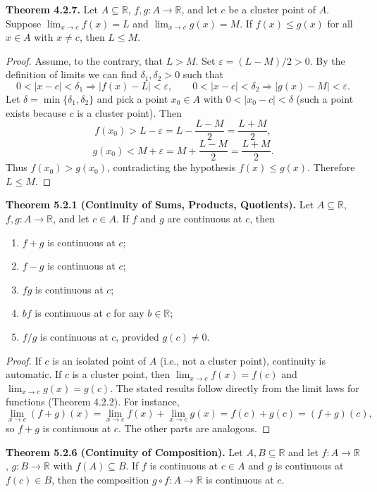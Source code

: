 \documentclass[12pt,a4paper]{article}
\theoremstyle{definition}
\newcommand{\R}{\mathbb{R}}
\newcommand{\eps}{\varepsilon}
\newcommand{\abs}[1]{\left\lvert#1\right\rvert}
\begin{document}
\textbf{Theorem 4.2.7.} Let \(A\subseteq\R\), \(f,g:A\to\R\), and let \(c\) be a cluster point of \(A\). Suppose \(\lim_{x\to c}f(x)=L\) and \(\lim_{x\to c}g(x)=M\). If \(f(x)\le g(x)\) for all \(x\in A\) with \(x\neq c\), then \(L\le M\).

\begin{proof}
Assume, to the contrary, that \(L>M\). Set \(\eps = (L-M)/2>0\). By the definition of limits we can find \(\delta_1,\delta_2>0\) such that
\[
0<\abs{x-c}<\delta_1 \Rightarrow \abs{f(x)-L}<\eps,\qquad
0<\abs{x-c}<\delta_2 \Rightarrow \abs{g(x)-M}<\eps.
\]
Let \(\delta = \min\{\delta_1,\delta_2\}\) and pick a point \(x_0\in A\) with \(0<\abs{x_0-c}<\delta\) (such a point exists because \(c\) is a cluster point). Then
\[
f(x_0) > L-\eps = L - \frac{L-M}{2} = \frac{L+M}{2},
\]
\[
g(x_0) < M+\eps = M + \frac{L-M}{2} = \frac{L+M}{2}.
\]
Thus \(f(x_0) > g(x_0)\), contradicting the hypothesis \(f(x)\le g(x)\). Therefore \(L\le M\).
\end{proof}

\textbf{Theorem 5.2.1 (Continuity of Sums, Products, Quotients).} Let \(A\subseteq\R\), \(f,g:A\to\R\), and let \(c\in A\). If \(f\) and \(g\) are continuous at \(c\), then
\begin{enumerate}[label=(\alph*)]
    \item \(f+g\) is continuous at \(c\);
    \item \(f-g\) is continuous at \(c\);
    \item \(fg\) is continuous at \(c\);
    \item \(b f\) is continuous at \(c\) for any \(b\in\R\);
    \item \(f/g\) is continuous at \(c\), provided \(g(c)\neq0\).
\end{enumerate}

\begin{proof}
If \(c\) is an isolated point of \(A\) (i.e., not a cluster point), continuity is automatic. If \(c\) is a cluster point, then \(\lim_{x\to c}f(x)=f(c)\) and \(\lim_{x\to c}g(x)=g(c)\). The stated results follow directly from the limit laws for functions (Theorem 4.2.2). For instance,
\[
\lim_{x\to c}(f+g)(x) = \lim_{x\to c}f(x) + \lim_{x\to c}g(x) = f(c)+g(c) = (f+g)(c),
\]
so \(f+g\) is continuous at \(c\). The other parts are analogous.
\end{proof}

\textbf{Theorem 5.2.6 (Continuity of Composition).} Let \(A,B\subseteq\R\) and let \(f:A\to\R\), \(g:B\to\R\) with \(f(A)\subseteq B\). If \(f\) is continuous at \(c\in A\) and \(g\) is continuous at \(f(c)\in B\), then the composition \(g\circ f:A\to\R\) is continuous at \(c\).
\end{document}
